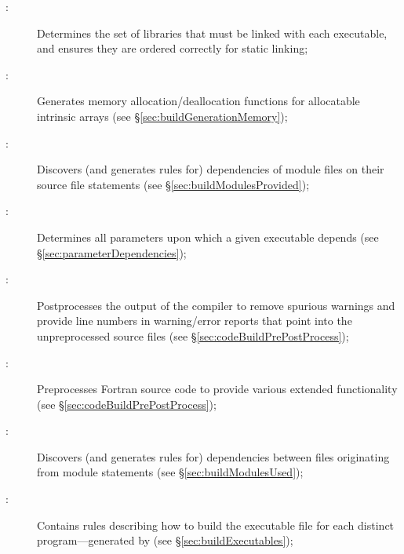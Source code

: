 \begin{description}
\item[:] Determines the set of libraries that must be linked with each executable, and ensures they are ordered correctly for static linking;

\item[:] Generates memory allocation/deallocation functions for allocatable intrinsic arrays (see \S\ref{sec:buildGenerationMemory});

\item[:] Discovers (and generates rules for) dependencies of module files on their source file statements (see \S\ref{sec:buildModulesProvided});

\item[:] Determines all parameters upon which a given executable depends (see \S\ref{sec:parameterDependencies});

\item[:] Postprocesses the output of the  compiler to remove spurious warnings and provide line numbers in warning/error reports that point into the unpreprocessed source files (see \S\ref{sec:codeBuildPrePostProcess});

\item[:] Preprocesses Fortran source code to provide various extended functionality (see \S\ref{sec:codeBuildPrePostProcess});

\item[:] Discovers (and generates rules for) dependencies between files originating from module  statements (see \S\ref{sec:buildModulesUsed});
  
\item[:] Contains rules describing how to build the executable file for each distinct program---generated by  (see \S\ref{sec:buildExecutables});


\end{description}
